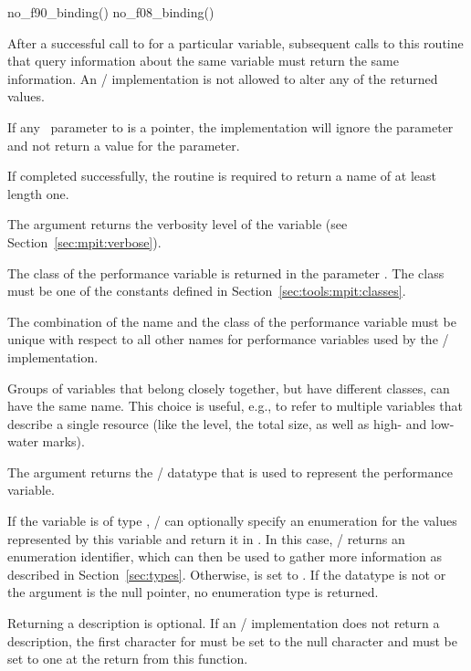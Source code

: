 \begin{mpi-binding}
    no_f90_binding()
    no_f08_binding()
\end{mpi-binding}

After a successful call to  for a
particular variable, subsequent calls to this routine that query
information about the same variable must return the same information.  An
\MPI/ implementation is not allowed to alter any of the returned values.

If any \OUT\ parameter to  is a
 pointer, the implementation will ignore the parameter and not
return a value for the parameter.

 If completed
successfully, the routine is required to return a name of at least length
one.

The argument  returns the verbosity level of the variable
(see Section~\ref{sec:mpit:verbose}).

The class of the performance variable is returned in the parameter
.  The class must be one of the constants defined in
Section~\ref{sec:tools:mpit:classes}.

The combination of the name and the class of the performance variable must
be unique with respect to all other names for  performance variables used
by the \MPI/ implementation.

\begin{implementors}
Groups of variables that belong closely together, but have different
classes, can have the same name.  This choice is useful, e.g., to refer to
multiple variables that describe a single resource (like the level, the
total size, as well as high- and low-water marks).
\end{implementors}

The argument  returns the \MPI/ datatype that is used to
represent the performance variable.

If the variable is of type , \MPI/ can optionally specify
an enumeration for the values represented by this variable and return it in
.  In this case, \MPI/ returns an enumeration identifier,
which can then be used to gather more information as described in
Section~\ref{sec:types}.  Otherwise,  is set to
.  If the datatype is not  or the
argument  is the null pointer, no enumeration type is
returned.

Returning a description is optional.  If an \mpi/ implementation does not
return a description, the first character for  must be set to
the null character and  must be set to one at the return
from this function.

